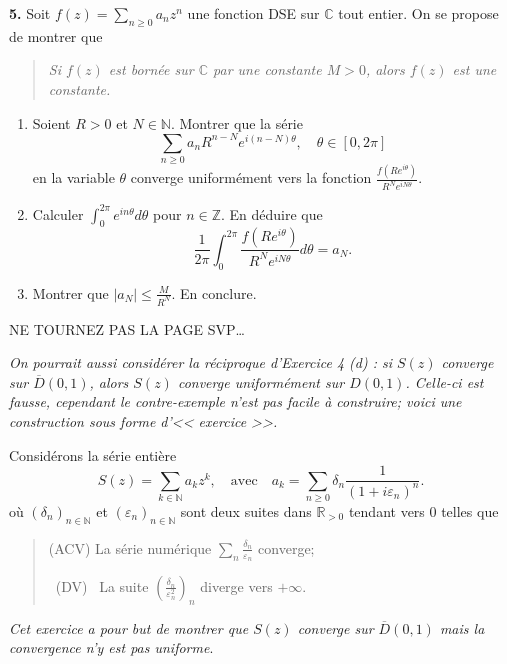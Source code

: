 \documentclass[a4paper,10pt]{article}
\newcommand{\N}{\mathbb{N}}
\newcommand{\Z}{\mathbb{Z}}
\newcommand{\R}{\mathbb{R}}
\newcommand{\C}{\mathbb{C}}
\newcommand{\abs}[1]{\left|#1\right|}
\begin{document}
\vspace{.1in}
\noindent
\textbf{5.}
Soit $f(z)=\sum_{n\geq0}a_nz^n$ une fonction DSE sur $\C$ tout entier. On se propose de montrer que 
\begin{quote}
    \textit{Si $f(z)$ est bornée sur $\C$ par une constante $M>0$, alors $f(z)$ est une constante.}
\end{quote}
\begin{enumerate}[label=\alph*)]
    \item Soient $R>0$ et $N\in\N$. Montrer que la série
    $$\sum_{n\geq0}a_nR^{n-N}e^{i(n-N)\theta},\quad \theta\in[0,2\pi]$$
    en la variable $\theta$ converge uniformément vers la fonction $\frac{f(Re^{i\theta})}{R^Ne^{iN\theta}}$.
    \item Calculer $\int_0^{2\pi}e^{in\theta}d\theta$ pour $n\in\Z$. En déduire que 
    $$\frac{1}{2\pi}\int_0^{2\pi}\frac{f(Re^{i\theta})}{R^Ne^{iN\theta}}d\theta=a_N.$$
    \item Montrer que $\abs{a_N}\leq\frac{M}{R^N}$. En conclure. 
\end{enumerate}

\vfill
\begin{center}
    NE TOURNEZ PAS LA PAGE SVP…
\end{center}

\newpage
\textit{On pourrait aussi considérer la réciproque d'Exercice 4 (d) : si $S(z)$ converge sur $\overline{D}(0,1)$, alors $S(z)$ converge uniformément sur $D(0,1)$. Celle-ci est fausse, cependant le contre-exemple n'est pas facile à construire; voici une construction sous forme d'<< exercice >>.}

\vspace{.1in}
Considérons la série entière
$$S(z)=\sum_{k\in\N}a_kz^k,\quad \text{avec}\quad a_k=\sum_{n\geq 0}\delta_n\frac{1}{(1+i\varepsilon_n)^n}.$$
où $(\delta_n)_{n\in\N}$ et $(\varepsilon_n)_{n\in\N}$ sont deux suites dans $\R_{>0}$ tendant vers 0 telles que
\begin{quote}
    (ACV) La série numérique $\sum_{n}\frac{\delta_n}{\varepsilon_n}$ converge;
    
    ~(DV)~ La suite $(\frac{\delta_n}{\varepsilon_n^2})_{n}$ diverge vers $+\infty$.
\end{quote}
\textit{Cet exercice a pour but de montrer que $S(z)$ converge sur $\overline{D}(0,1)$ mais la convergence n'y est pas uniforme}.
\end{document}

